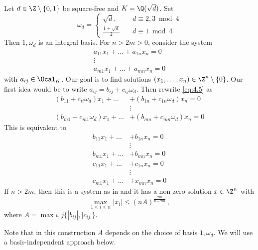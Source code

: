 \begin{exmp*}
	Let \( d \in \Z \setminus \{0,1\} \) be square-free and \( K = \Q(\sqrt{d}) \).
	Set
	\[ \omega_d = \begin{cases}
		\sqrt{d}, &d \equiv 2,3 \bmod 4\\
		\frac{1 + \sqrt{d}}{2} \quad &d \equiv 1 \bmod 4
	\end{cases} \]
	Then \( 1, \omega_d \) is an integral basis.
	For \( n > 2m > 0 \), consider the system
	\begin{equation}\label{eq:4.5}
		\begin{array}{c}
			a_{11} x_1 + \dots + a_{1n} x_n = 0\\
			\vdots \\
			a_{m1} x_1 + \dots + a_{mn} x_n = 0
		\end{array}
	\end{equation}
	with \( a_{ij} \in \Ocal_K \).
	Our goal is to find solutions \( (x_1, \dotsc, x_n) \in \Z^n \setminus \{0\} \).
	Our first idea would be to write \( a_{ij} = b_{ij} + c_{ij} \omega_d \).
	Then rewrite \eqref{eq:4.5} as
	\begin{align*}
		(b_{11} + c_{ii}\omega_d) x_1 + \dots &+ (b_{1n} + c_{1n}\omega_d) x_n = 0\\
		&\vdots \\
		(b_{m1} + c_{m1}\omega_d) x_1 + \dots &+ (b_{mn} + c_{mn}\omega_d) x_n = 0
	\end{align*}
	This is equivalent to
	\begin{align*}
		b_{11}x_1 + \dots &+ b_{1n}x_n = 0\\
		&\vdots\\
		b_{m1}x_1 + \dots &+ b_{mn}x_n = 0\\
		c_{11}x_1 + \dots &+ c_{1n}x_n = 0\\
		&\vdots\\
		c_{m1}x_1 + \dots &+ x_{mn}x_n = 0
	\end{align*}
	If \( n > 2m \), then this is a system as in  and it has a non-zero solution \( x \in \Z^n \) with
	\[ \max_{1 \leq i \leq n} |x_i| \leq (nA)^\frac{2m}{n-2m} \,, \]
	where \( A = \max{i,j} \big\{ |b_{ij}|, |c_{ij|} \big\} \).
\end{exmp*}

\begin{rem*}
	Note that in this construction \( A \) depends on the choice of basis \( 1, \omega_d \).
	We will use a basis-independent approach below.
\end{rem*}

